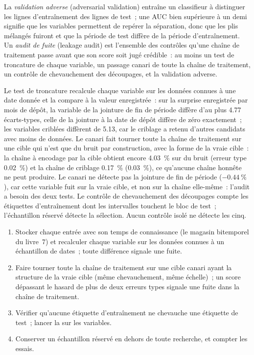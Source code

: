 \begin{definition}\label{def:ml:validation:audit}
La \emph{validation adverse} (adversarial validation) entraîne un classifieur à distinguer les lignes d'entraînement des lignes de test~; une
AUC bien supérieure à un demi signifie que les variables permettent de repérer la séparation, donc que les plis mélangés fuiront et que la période de test diffère
de la période d'entraînement. Un \emph{audit de fuite} (leakage audit) est l'ensemble des contrôles qu'une chaîne de traitement passe avant que son
score soit jugé crédible~: au moins un test de troncature de chaque variable, un passage canari de toute la chaîne de traitement, un contrôle de chevauchement des
découpages, et la validation adverse.
\end{definition}

Le test de troncature recalcule chaque variable sur les données connues à une date donnée et la compare à la valeur enregistrée~: sur la
surprise enregistrée par mois de dépôt, la variable de la jointure de fin de période diffère d'au plus 4.77 écarts-types, celle de la jointure à la date de dépôt
diffère de zéro exactement~; les variables criblées diffèrent de 5.13, car le criblage a retenu d'autres candidats avec moins
de données. Le canari fait tourner toute la chaîne de traitement sur une cible qui n'est que du bruit par construction, avec la forme de la vraie cible~: la
chaîne à encodage par la cible obtient encore 4.03~\% sur du bruit (erreur type 0.02~\%) et la chaîne de criblage 0.17~\% (0.03~\%),
ce qu'aucune chaîne honnête ne peut produire. Le canari ne détecte pas la jointure de fin de période ($-0.44~\%$), car cette variable fuit
sur la vraie cible, et non sur la chaîne elle-même~: l'audit a besoin des deux tests. Le contrôle de chevauchement des découpages compte les étiquettes d'entraînement
dont les intervalles touchent le bloc de test~; l'échantillon réservé détecte la sélection. Aucun contrôle isolé ne détecte les cinq.

\begin{method}\label{met:ml:validation:audit}
\begin{enumerate}
\item Stocker chaque entrée avec son temps de connaissance (le magasin bitemporel du livre~7) et recalculer chaque variable sur les données
connues à un échantillon de dates~; toute différence signale une fuite.
\item Faire tourner toute la chaîne de traitement sur une cible canari ayant la structure de la vraie cible (même chevauchement, même échelle)~; un score
dépassant le hasard de plus de deux erreurs types signale une fuite dans la chaîne de traitement.
\item Vérifier qu'aucune étiquette d'entraînement ne chevauche une étiquette de test~; lancer la  sur les variables.
\item Conserver un échantillon réservé en dehors de toute recherche, et compter les essais.
\end{enumerate}
\end{method}

